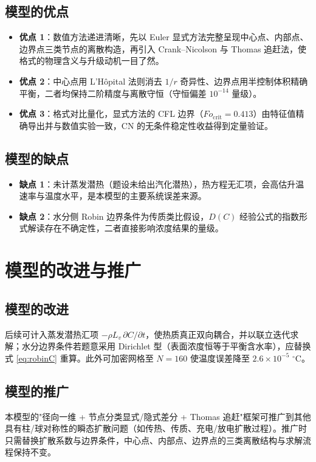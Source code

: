 \documentclass[12pt,a4paper]{ctexart}
\begin{document}
\subsection{模型的优点}
\begin{itemize}
\item \textbf{优点 1}：数值方法递进清晰，先以 Euler 显式方法完整呈现中心点、内部点、边界点三类节点的离散构造，再引入 Crank--Nicolson 与 Thomas 追赶法，使格式的物理含义与升级动机一目了然。
\item \textbf{优点 2}：中心点用 L'H\^opital 法则消去 $1/r$ 奇异性、边界点用半控制体积精确平衡，二者均保持二阶精度与离散守恒（守恒偏差 $10^{-14}$ 量级）。
\item \textbf{优点 3}：格式对比量化，显式方法的 CFL 边界（$Fo_{\text{crit}}=0.413$）由特征值精确导出并与数值实验一致，CN 的无条件稳定性收益得到定量验证。
\end{itemize}
\subsection{模型的缺点}
\begin{itemize}
\item \textbf{缺点 1}：未计蒸发潜热（题设未给出汽化潜热），热方程无汇项，会高估升温速率与温度水平，是本模型的主要系统误差来源。
\item \textbf{缺点 2}：水分侧 Robin 边界条件为传质类比假设，$D(C)$ 经验公式的指数形式解读存在不确定性，二者直接影响浓度结果的量级。
\end{itemize}

\section{模型的改进与推广}
\subsection{模型的改进}
后续可计入蒸发潜热汇项 $-\rho L_v\,\partial C/\partial t$，使热质真正双向耦合，并以联立迭代求解；水分边界条件若题意采用 Dirichlet 型（表面浓度恒等于平衡含水率），应替换式 \eqref{eq:robinC} 重算。此外可加密网格至 $N=160$ 使温度误差降至 $2.6\times10^{-5}$ $^\circ$C。
\subsection{模型的推广}
本模型的"径向一维 + 节点分类显式/隐式差分 + Thomas 追赶"框架可推广到其他具有柱/球对称性的瞬态扩散问题（如传热、传质、充电/放电扩散过程）。推广时只需替换扩散系数与边界条件，中心点、内部点、边界点的三类离散结构与求解流程保持不变。
\end{document}

